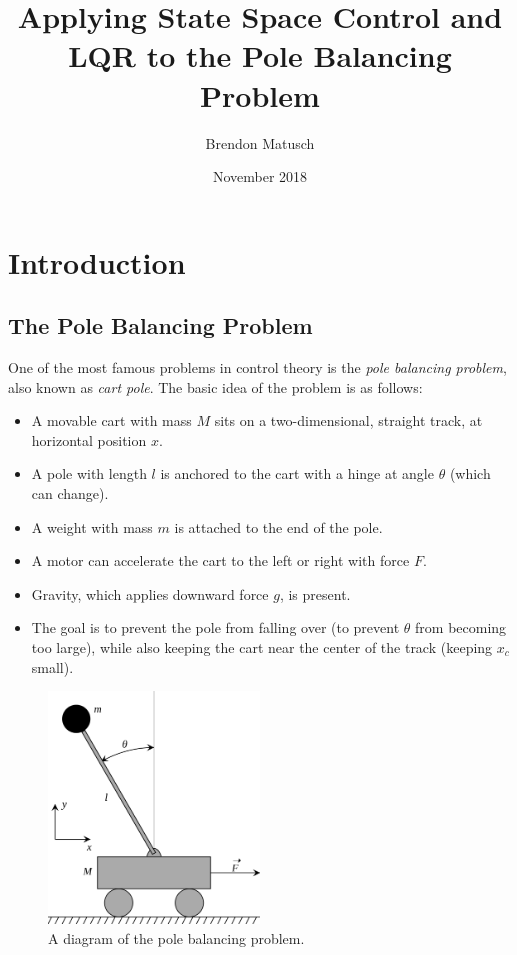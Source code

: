 \documentclass[12pt]{article}
\begin{document}
\title{Applying State Space Control and LQR to the Pole Balancing Problem}
\author{Brendon Matusch}
\date{November 2018}
\maketitle

\section{Introduction}

\subsection{The Pole Balancing Problem} \label{problem}

One of the most famous problems in control theory is the \textit{pole balancing problem}, also known as \textit{cart pole}. The basic idea of the problem is as follows:

\begin{itemize}
    \item A movable cart with mass $M$ sits on a two-dimensional, straight track, at horizontal position $x$.
    \item A pole with length $l$ is anchored to the cart with a hinge at angle $\theta$ (which can change).
    \item A weight with mass $m$ is attached to the end of the pole.
    \item A motor can accelerate the cart to the left or right with force $F$.
    \item Gravity, which applies downward force $g$, is present.
    \item The goal is to prevent the pole from falling over (to prevent $\theta$ from becoming too large), while also keeping the cart near the center of the track (keeping $x _c$ small).
\end{itemize}

\begin{figure}[ht]
    \centering
    \includegraphics[width=0.5\textwidth]{cartpole}
    \caption{\label{cartpole} A diagram of the pole balancing problem.}
\end{figure}
\end{document}
